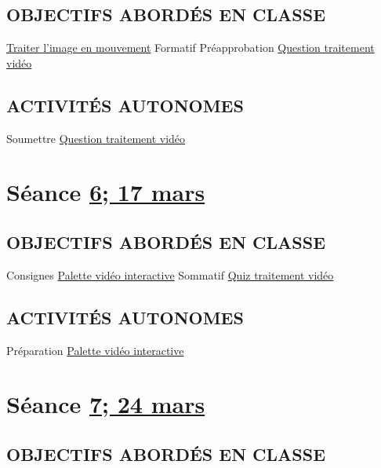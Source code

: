 \documentclass[
]{book}
\begin{document}
\hypertarget{objectifs-aborduxe9s-en-classe-5}{%
\subsection{OBJECTIFS ABORDÉS EN CLASSE}\label{objectifs-aborduxe9s-en-classe-5}}

\protect\hyperlink{traiter}{Traiter l'image en mouvement} Formatif Préapprobation \protect\hyperlink{sommatif_2}{Question traitement vidéo}

\hypertarget{activituxe9s-autonomes-5}{%
\subsection{ACTIVITÉS AUTONOMES}\label{activituxe9s-autonomes-5}}

Soumettre \protect\hyperlink{sommatif_2}{Question traitement vidéo}

\hypertarget{semaine_7}{%
\section{\texorpdfstring{Séance \protect\hyperlink{semaine_7}{6; 17 mars}}{Séance 6; 17 mars}}\label{semaine_7}}

\hypertarget{objectifs-aborduxe9s-en-classe-6}{%
\subsection{OBJECTIFS ABORDÉS EN CLASSE}\label{objectifs-aborduxe9s-en-classe-6}}

Consignes \protect\hyperlink{sommatif_4}{Palette vidéo interactive} Sommatif \protect\hyperlink{sommatif_3}{Quiz traitement vidéo}

\hypertarget{activituxe9s-autonomes-6}{%
\subsection{ACTIVITÉS AUTONOMES}\label{activituxe9s-autonomes-6}}

Préparation \protect\hyperlink{sommatif_4}{Palette vidéo interactive}

\hypertarget{semaine_8}{%
\section{\texorpdfstring{Séance \protect\hyperlink{semaine_8}{7; 24 mars}}{Séance 7; 24 mars}}\label{semaine_8}}

\hypertarget{objectifs-aborduxe9s-en-classe-7}{%
\subsection{OBJECTIFS ABORDÉS EN CLASSE}\label{objectifs-aborduxe9s-en-classe-7}}
\end{document}
